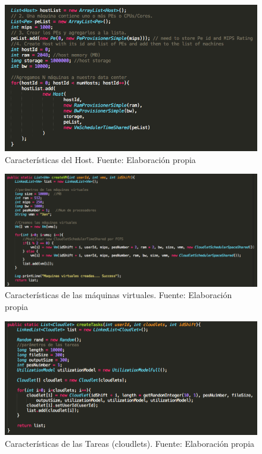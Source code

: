 \begin{figure}[h]
	\caption{Características del Host. Fuente: Elaboración propia}
	\centering
	\includegraphics[scale=0.5]{media/caracteristicas_host}
\end{figure}


\begin{figure}[h]
	\caption{Características de las máquinas virtuales. Fuente: Elaboración propia}
	\centering
	\includegraphics[scale=0.3]{media/creacion_vm}
\end{figure}


\begin{figure}[h]
	\caption{Características de las Tareas (cloudlets). Fuente: Elaboración propia}
	\centering
	\includegraphics[scale=0.5]{media/creacion_cloudlet}
\end{figure} 

